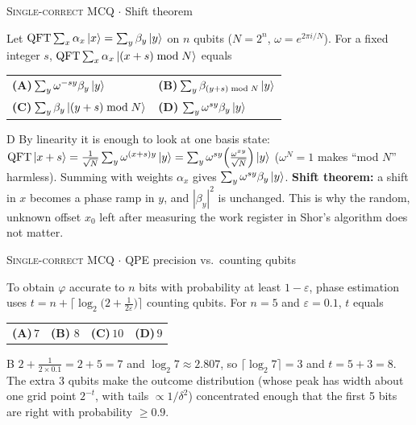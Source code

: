 \documentclass[11pt,a4paper]{article}
\newcommand{\optlabel}[1]{\textbf{(#1)}}
\newcommand{\correctlabel}[1]{\textcolor{okgreen}{\textbf{(#1)}\,\ding{51}}}
\newenvironment{qitem}[1]{\begin{list}{}{\setlength{\leftmargin}{3.3em}\setlength{\labelwidth}{3.1em}%
  \setlength{\labelsep}{0.2em}\setlength{\topsep}{3pt}\setlength{\parsep}{3pt}}\item[\textbf{Q.#1}\hfill]}{\end{list}}
\newcommand{\qsep}{\par\vspace{2pt}{\color{black!15}\hrule}\vspace{4pt}}
\newcommand{\qmeta}[2]{{\footnotesize\color{black!60}\textsc{#1} \;$\cdot$\; #2}\par}
\begin{document}
\begin{qitem}{63}
\qmeta{Single-correct MCQ}{Shift theorem}
Let $\mathrm{QFT}\sum_x\alpha_x\ket{x} = \sum_y\beta_y\ket{y}$ on $n$ qubits ($N = 2^n$, $\omega = e^{2\pi i/N}$). For a fixed integer $s$,
$\mathrm{QFT}\sum_x\alpha_x\ket{(x + s) \bmod N}$ equals
\par\smallskip\noindent\begin{tabularx}{\linewidth}{@{}*{2}{L}@{}}
\optlabel{A}\,$\sum_y\omega^{-sy}\beta_y\ket{y}$ & \optlabel{B}\,$\sum_y\beta_{(y+s)\bmod N}\ket{y}$ \\[3pt]
\optlabel{C}\,$\sum_y\beta_y\ket{(y + s)\bmod N}$ & \correctlabel{D}\,$\sum_y\omega^{sy}\beta_y\ket{y}$
\end{tabularx}
\end{qitem}
\begin{solbox}{D}
By linearity it is enough to look at one basis state:
$\mathrm{QFT}\ket{x+s} = \frac{1}{\sqrt N}\sum_y\omega^{(x+s)y}\ket y = \sum_y\omega^{sy}\Big(\frac{\omega^{xy}}{\sqrt N}\Big)\ket y$
($\omega^{N} = 1$ makes ``mod $N$'' harmless). Summing with weights $\alpha_x$ gives $\sum_y\omega^{sy}\beta_y\ket y$.
\textbf{Shift theorem:} a shift in $x$ becomes a phase ramp in $y$, and $|\beta_y|^2$ is unchanged. This is why the random,
unknown offset $x_0$ left after measuring the work register in Shor's algorithm does not matter.
\end{solbox}
\qsep

\begin{qitem}{64}
\qmeta{Single-correct MCQ}{QPE precision vs.\ counting qubits}
To obtain $\varphi$ accurate to $n$ bits with probability at least $1 - \varepsilon$, phase estimation uses
$t = n + \big\lceil \log_2\!\big(2 + \frac{1}{2\varepsilon}\big)\big\rceil$ counting qubits. For $n = 5$ and $\varepsilon = 0.1$, $t$ equals
\par\smallskip\noindent\begin{tabularx}{\linewidth}{@{}*{4}{L}@{}}
\optlabel{A}\,$7$ & \correctlabel{B}\,$8$ & \optlabel{C}\,$10$ & \optlabel{D}\,$9$
\end{tabularx}
\end{qitem}
\begin{solbox}{B}
$2 + \frac{1}{2\times0.1} = 2 + 5 = 7$ and $\log_2 7 \approx 2.807$, so $\lceil\log_2 7\rceil = 3$ and $t = 5 + 3 = 8$.
The extra 3 qubits make the outcome distribution (whose peak has width about one grid point $2^{-t}$, with tails
$\propto 1/\delta^2$) concentrated enough that the first 5 bits are right with probability $\ge 0.9$.
\end{solbox}
\qsep
\end{document}

